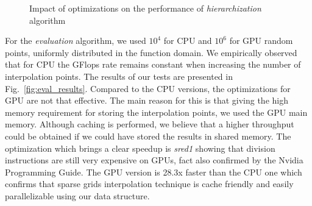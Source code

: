 \begin{figure}[h]
\begin{center}
\begin{minipage}[t]{\textwidth}%
\vspace{0cm}%
\begin{minipage}[c]{0.5\textwidth}%
\vspace{0cm}%
\begin{center}
\end{center}
\end{minipage}%
\begin{minipage}[c]{0.5\textwidth}%
\vspace{0cm}%
\begin{center}
\end{center}
\end{minipage}%
\end{minipage}%
\end{center}
\caption{Impact of optimizations on the performance of \textit{hierarchization}
algorithm}
\label{fig:hier_results}
\end{figure}

For the \textit{evaluation} algorithm, we used $10^{4}$ for CPU and $10^{6}$
for GPU random points, uniformly distributed in the function domain. We
empirically observed that for CPU the GFlops rate remains constant when
increasing the number of interpolation points. The results of our tests are
presented in Fig.~\ref{fig:eval_results}. Compared to the CPU versions, the
optimizations for GPU are not that effective. The main reason for this is that
giving the high memory requirement for storing the interpolation points, we used
the GPU main memory. Although caching is performed, we believe that a higher
throughput could be obtained if we could have stored the results in shared
memory. The optimization which brings a clear speedup is \textit{sred1} showing
that division instructions are still very expensive on GPUs, fact also confirmed
by the Nvidia Programming Guide. The GPU version is 28.3x faster than the CPU
one which confirms that sparse grids interpolation technique is cache friendly
and easily parallelizable using our data structure.

